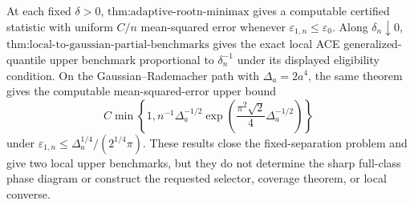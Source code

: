 At each fixed \(\delta>0\), \(\text{thm:adaptive-rootn-minimax}\) gives a computable certified statistic with uniform \(C/n\) mean-squared error whenever \(\varepsilon_{1,n}\le\varepsilon_0\). Along \(\delta_n\downarrow0\), \(\text{thm:local-to-gaussian-partial-benchmarks}\) gives the exact local ACE generalized-quantile upper benchmark proportional to \(\delta_n^{-1}\) under its displayed eligibility condition. On the Gaussian--Rademacher path with \(\Delta_a=2a^4\), the same theorem gives the computable mean-squared-error upper bound
\[
 C\min\!\left\{1,n^{-1}\Delta_a^{-1/2}
 \exp\!\left(\frac{\pi^2\sqrt2}{4}\Delta_a^{-1/2}\right)\right\}
\]
under \(\varepsilon_{1,n}\le\Delta_a^{1/4}/(2^{1/4}\pi)\). These results close the fixed-separation problem and give two local upper benchmarks, but they do not determine the sharp full-class phase diagram or construct the requested selector, coverage theorem, or local converse.